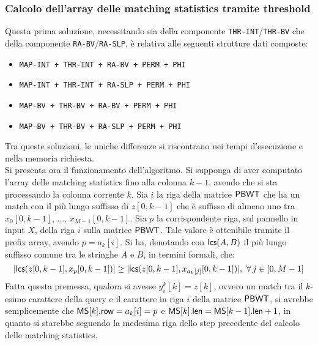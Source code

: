 \subsubsection{Calcolo dell'array delle matching statistics tramite threshold}
Questa prima soluzione, necessitando sia della componente
\texttt{THR-INT}/\texttt{THR-BV} che della componente
\texttt{RA-BV}/\texttt{RA-SLP}, è relativa alle seguenti strutture dati
composte: 
\begin{itemize}
  \item \texttt{MAP-INT + THR-INT + RA-BV + PERM + PHI}
  \item \texttt{MAP-INT + THR-INT + RA-SLP + PERM + PHI}
  \item \texttt{MAP-BV + THR-BV + RA-BV + PERM + PHI}
  \item \texttt{MAP-BV + THR-BV + RA-SLP + PERM + PHI}
\end{itemize}
Tra queste soluzioni, le uniche differenze si riscontrano nei tempi d'esecuzione
e nella memoria richiesta.\\
Si presenta ora il funzionamento dell'algoritmo.
Si supponga di aver computato l'array delle matching statistics fino alla
colonna $k-1$, avendo che si sta processando la colonna corrente $k$.
Sia $i$ la riga della matrice $\mbox{\rm {\sf PBWT}}$ che ha un match con il più lungo
suffisso di $z[0,k-1]$ che è suffisso di almeno uno tra $x_0[0,k-1]$, $\ldots$,
$x_{M-1}[0,k-1]$. Sia $p$ la corrispondente riga, sul pannello in input $X$,
della riga
$i$ sulla matrice $\mbox{\rm {\sf PBWT}}$. Tale valore è ottenibile tramite il prefix array,
avendo $p=a_k[i]$. Si ha, 
denotando con
$\mbox{\rm {\sf lcs}}(A,B)$ il più lungo suffisso comune tra le stringhe $A$ e $B$, in
termini formali, che:
\begin{equation}
  \label{eq:thr1}
  |\mbox{\rm {\sf lcs}}(z[0,k-1], x_{p}[0,k-1])|\geq |\mbox{\rm {\sf lcs}}(z[0,k-1],
  x_{a_k[j]}[0,k-1])|,\,\,\forall\, 
  j\in[0,M-1] 
\end{equation}
Fatta questa premessa, qualora si avesse $y_i^k[k]=z[k]$, ovvero un match tra il
$k$-esimo carattere della query e il carattere in riga $i$ della matrice
$\mbox{\rm {\sf PBWT}}$, si 
avrebbe semplicemente che $\mbox{\rm {\sf MS}}[k].\mbox{\rm {\sf row}}=a_k[i]=p$ e $\mbox{\rm {\sf MS}}[k].\mbox{\rm {\sf len}} =
\mbox{\rm {\sf MS}}[k-1].\mbox{\rm {\sf len}}+1$, in 
quanto si starebbe seguendo la medesima riga dello step precedente del calcolo
delle matching statistics.\\
